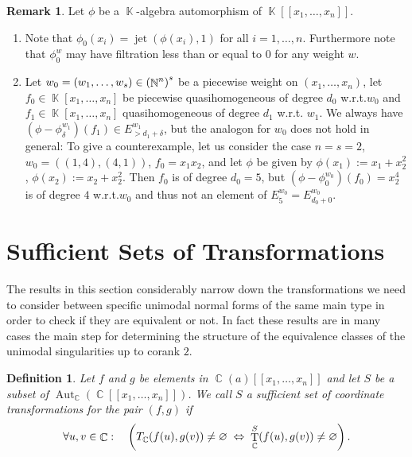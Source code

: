 \documentclass[noend]{amsproc}
\newtheorem{defn}[theorem]{Definition}
\theoremstyle{definition}
\newtheorem{remark}[theorem]{Remark}
\let\originalleft\left
\let\originalright\right
\renewcommand{\left}{\mathopen{}\mathclose\bgroup\originalleft}
\renewcommand{\right}{\aftergroup\egroup\originalright}
\DeclareMathOperator{\N}{\mathbb{N}}
\DeclareMathOperator{\C}{\mathbb{C}}
\DeclareMathOperator{\K}{\mathbb{K}}
\DeclareMathOperator{\T}{T}
\DeclareMathOperator{\Aut}{Aut}
\DeclareMathOperator{\jet}{jet}
\begin{document}
\begin{remark}\label{rem:weighted_jet}
Let $\phi$ be a $\K$-algebra automorphism of $\K[[x_1,\ldots,x_n]]$.

\begin{enumerate}
\item
Note that $\phi_0(x_i) = \jet(\phi(x_i), 1)$ for all $i = 1, \ldots, n$.
Furthermore note that $\phi_0^w$ may have filtration less than or equal to $0$
for any weight $w$.

\item\label{enum:weighted_jet}
Let $w_0 = (w_1, \ldots, w_s) \in \left(\N^n\right)^s$ be a piecewise weight on
$(x_1, \ldots, x_n)$, let $f_0 \in \K[x_1,\ldots,x_n]$ be piecewise
quasihomogeneous of degree $d_0$ w.r.t.\@ $w_0$ and
$f_1 \in \K[x_1,\ldots,x_n]$ quasihomogeneous of degree $d_1$ w.r.t.\@
$w_1$. We always have
$(\phi-\phi_\delta^{w_1})(f_1) \in E_{>d_1+\delta}^{w_1}$, but the analogon for
$w_0$ does not hold in general: To give a counterexample, let us consider the
case $n = s = 2$, $w_0 = ((1,4), (4,1))$, $f_0 = x_1 x_2$, and let $\phi$ be
given by $\phi(x_1) := x_1+x_2^2$, $\phi(x_2) := x_2+x_2^2$. Then $f_0$ is of
degree $d_0 = 5$, but $(\phi-\phi_0^{w_0})(f_0) = x_2^4$ is of degree $4$
w.r.t.\@ $w_0$ and thus not an element of $E_5^{w_0} = E_{d_0+0}^{w_0}$.
\end{enumerate}
\end{remark}


\section{Sufficient Sets of Transformations}

The results in this section considerably narrow down the transformations we
need to consider between specific unimodal normal forms of the same main type
in order to check if they are equivalent or not. In fact these results are in
many cases the main step for determining the structure of the equivalence
classes of the unimodal singularities up to corank $2$.

\begin{defn}
Let $f$ and $g$ be elements in $\C(a)[[x_1,\ldots,x_n]]$ and let $S$ be a
subset of $\Aut_{\C}(\C[[x_1,\ldots,x_n]])$. We call $S$ a sufficient set of
coordinate transformations for the pair $(f, g)$ if
\[
\forall u,v \in \C: \quad
\left(T_{\C}(f(u),g(v)) \neq \varnothing
\;\Leftrightarrow\; \T_{\C}^S(f(u),g(v)) \neq \varnothing\right) \,.
\]
\end{defn}
\end{document}
